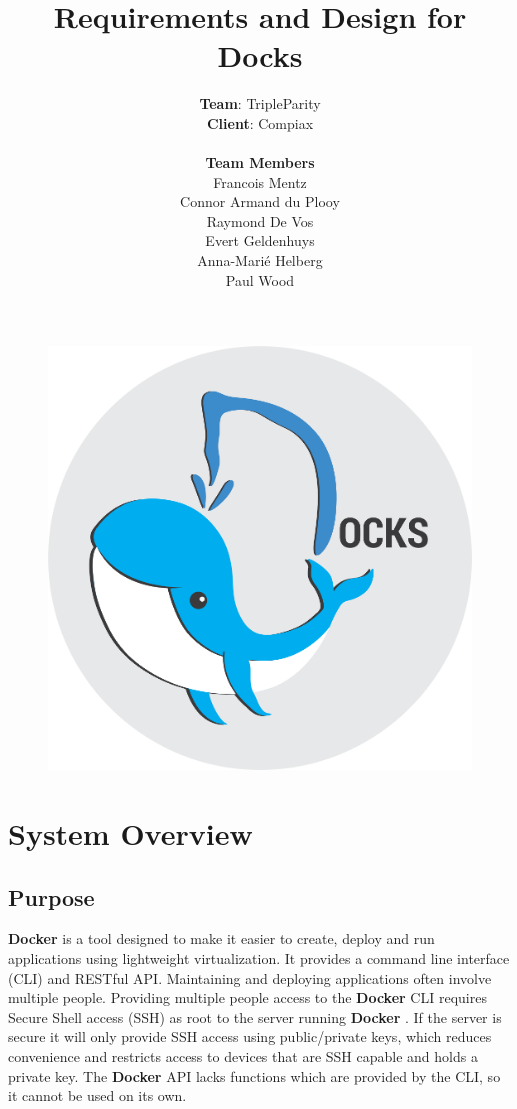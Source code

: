 \documentclass[]{article}
\title{\vspace{-1.0cm}Requirements and Design for Docks}
\author{\textbf{Team}: TripleParity\\
\textbf{Client}: Compiax\\
\\
\textbf{Team Members}\\
Francois Mentz\\
Connor Armand du Plooy\\
Raymond De Vos\\
Evert Geldenhuys\\
Anna-Marié Helberg\\
Paul Wood}
\date{}
\newcommand{\docker}{\textbf{\textcolor{OliveGreen}{Docker}} }
\begin{document}
\begin{figure}[]
	\includegraphics[scale=0.7]{docks_round_512.png}
	\centering
\end{figure}

\maketitle

\tableofcontents

\pagebreak

\section{System Overview}
\subsection{Purpose}

\docker is a tool designed to make it easier to create, deploy and run applications
using lightweight virtualization. It provides a command line interface (CLI)
and RESTful API. Maintaining and deploying applications often involve multiple
people. Providing multiple people access to the \docker CLI requires
Secure Shell access (SSH) as root to the server running \docker. If the server
is secure it will only provide SSH access using public/private keys, which
reduces convenience and restricts access to devices that are SSH capable and
holds a private key. The \docker API lacks functions which are provided by
the CLI, so it cannot be used on its own.
\end{document}
